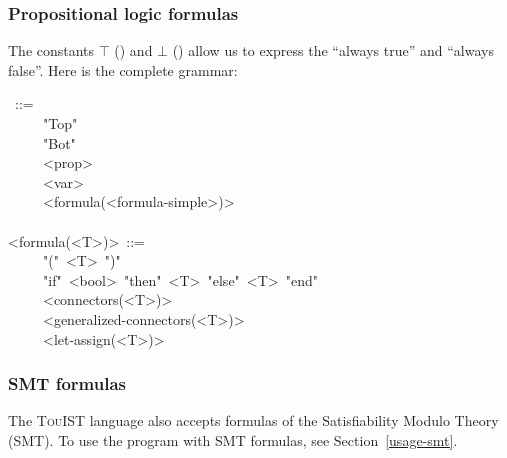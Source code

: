 {\subsubsection{Propositional logic formulas}\label{sec-propositional-logic-formulas}%

\noindent The constants $\top$ () and $\bot$ () allow us to express
the \textquotedblleft{}always true\textquotedblright{} and \textquotedblleft{}always false\textquotedblright{}. Here is the complete grammar:%
\begin{mdpre}%
~::=\\
~~~~\textbar{}~"Top"\\
~~~~\textbar{}~"Bot"\\
~~~~\textbar{}~{\textless{}prop\textgreater{}}\\
~~~~\textbar{}~{\textless{}var\textgreater{}}\\
~~~~\textbar{}~{\textless{}formula(\textless{}formula-simple\textgreater{})\textgreater{}}\\
\\
{\textless{}formula(\textless{}T\textgreater{})\textgreater{}}~::=\\
~~~~\textbar{}~"("~{\textless{}T\textgreater{}}~")"\\
~~~~\textbar{}~"if"~{\textless{}bool\textgreater{}}~"then"~{\textless{}T\textgreater{}}~"else"~{\textless{}T\textgreater{}}~"end"\\
~~~~\textbar{}~{\textless{}connectors(\textless{}T\textgreater{})\textgreater{}}\\
~~~~\textbar{}~{\textless{}generalized-connectors(\textless{}T\textgreater{})\textgreater{}}\\
~~~~\textbar{}~{\textless{}let-assign(\textless{}T\textgreater{})\textgreater{}}\\
\end{mdpre}
\subsubsection{SMT formulas}\label{sec-smt-formulas}%

\noindent The {\scshape TouIST} language also accepts formulas of the Satisfiability Modulo Theory (SMT).
To use the  program with SMT formulas, see Section~\ref{usage-smt}.%

}
